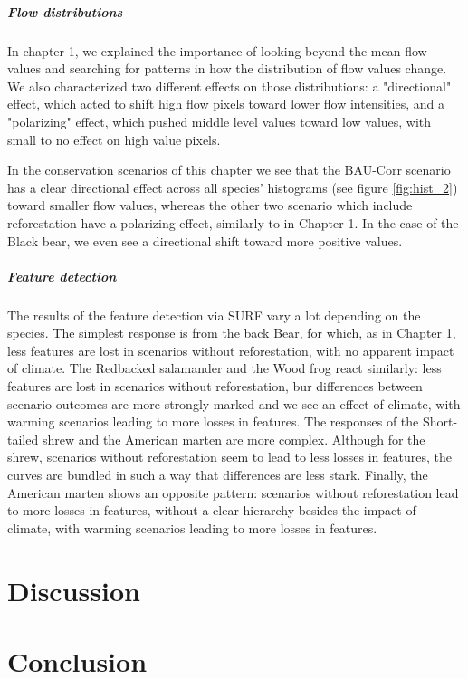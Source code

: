 {\vspace{1em}

\subparagraph*{\textit{Flow distributions}} In chapter 1, we explained the importance of looking beyond the mean flow values and searching for patterns in how the distribution of flow values change. We also characterized two different effects on those distributions: a "directional" effect, which acted to shift high flow pixels toward lower flow intensities, and a "polarizing" effect, which pushed middle level values toward low values, with small to no effect on high value pixels.

In the conservation scenarios of this chapter we see that the BAU-Corr scenario has a clear directional effect across all species' histograms (see figure \ref{fig:hist_2}) toward smaller flow values, whereas the other two scenario which include reforestation have a polarizing effect, similarly to in Chapter 1. In the case of the Black bear, we even see a directional shift toward more positive values.

\vspace{1em}

\subparagraph*{\textit{Feature detection}} The results of the feature detection via SURF vary a lot depending on the species. The simplest response is from the back Bear, for which, as in Chapter 1, less features are lost in scenarios without reforestation, with no apparent impact of climate. The Redbacked salamander and the Wood frog react similarly: less features are lost in scenarios without reforestation, bur differences between scenario outcomes are more strongly marked and we see an effect of climate, with warming scenarios leading to more losses in features. The responses of the Short-tailed shrew and the American marten are more complex. Although for the shrew, scenarios without reforestation seem to lead to less losses in features, the curves are bundled in such a way that differences are less stark. Finally, the American marten shows an opposite pattern: scenarios without reforestation lead to more losses in features, without a clear hierarchy besides the impact of climate, with warming scenarios leading to more losses in features.\\

\section{Discussion}


\section{Conclusion}

}
